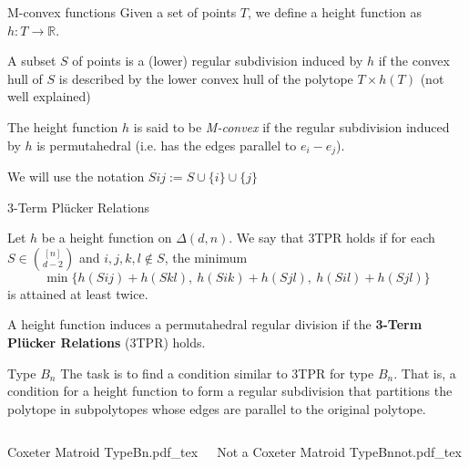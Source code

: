 \documentclass{beamer}
\newcommand{\incfig}[1]{%
\center
\def\svgwidth{0.9\columnwidth}
{#1.pdf_tex}
}
\begin{document}
\begin{frame}{M-convex functions}
Given a set of points $T$, we define a height function as  $h:T \to \mathbb{R}$.

\begin{definition}
A subset $S$ of points is a (lower) regular subdivision induced by $h$ if the convex hull of $S$ is described by the lower convex hull of the polytope $T\times h(T)$ (not well explained)
\end{definition}

\begin{definition}
The height function $h$ is said to be \textit{M-convex} if the regular subdivision induced by $h$ is permutahedral (i.e. has the edges parallel to $e_i-e_j$).
\end{definition}

We will use the notation $Sij := S\cup \{i\}\cup \{j\}$

\end{frame}

\begin{frame}{3-Term Plücker Relations}

\begin{definition} Let $h $ be a height function on $\Delta(d, n)$.
We say that 3TPR holds if for each $S\in \binom{[n]}{ d-2}$ and $i, j, k, l \not\in S$, the minimum
\[
\min \Big\{h(Sij) + h(Skl), \ h(Sik) + h(Sjl),\  h(Sil) +  h(Sjl)\Big\}
\] 
is attained at least twice.
\end{definition}

\begin{theorem}[] A height function induces a permutahedral regular division if the \textbf{3-Term Plücker Relations} (3TPR) holds.
\end{theorem}
\end{frame}
  
\begin{frame}{Type $B_n$}
 The task is to find a condition similar to 3TPR for type $B_n$. That is, a condition for a height function to form a regular subdivision that partitions the polytope in subpolytopes whose edges are parallel to the original polytope. 

\begin{columns}[c]
 \begin{block}{Coxeter Matroid}
  \incfig{TypeBn} 
 \end{block}
 \begin{block}{Not a Coxeter Matroid}
  \incfig{TypeBnnot} 
 \end{block}
\end{columns}

\end{frame}
\end{document}
